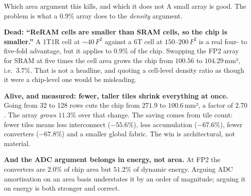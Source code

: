 \documentclass[11pt,a4paper]{report}
\begin{document}
\begin{keybox}{Which area argument this kills, and which it does not}
A small array is good. The problem is what a $0.9\%$ array does to the
\emph{density} argument.

\textbf{Dead: ``ReRAM cells are smaller than SRAM cells, so the chip is
smaller.''} A 1T1R cell at ${\sim}40\,F^2$ against a 6T cell at
$150$--$200\,F^2$ is a real four- to five-fold advantage, but it applies to
$0.9\%$ of the chip. Swapping the FP2 array for SRAM at five times the cell
area grows the chip from $100.56$ to $104.29$\,mm², i.e.\ $3.7\%$. That is
not a headline, and quoting a cell-level density ratio as though it were a
chip-level one would be misleading.

\textbf{Alive, and measured: fewer, taller tiles shrink everything at once.}
Going from 32 to 128 rows cuts the chip from $271.9$ to $100.6$\,mm², a factor
of $2.70$. The array \emph{grows} $11.3\%$ over that change. The saving comes
from tile count: fewer tiles means less interconnect ($-55.6\%$), less
accumulation ($-67.6\%$), fewer converters ($-67.8\%$) and a smaller global
fabric. The win is architectural, not material.

\textbf{And the ADC argument belongs in energy, not area.} At FP2 the
converters are $2.0\%$ of chip area but $51.2\%$ of dynamic energy. Arguing
ADC amortisation on an area basis understates it by an order of magnitude;
arguing it on energy is both stronger and correct.
\end{keybox}
\end{document}
